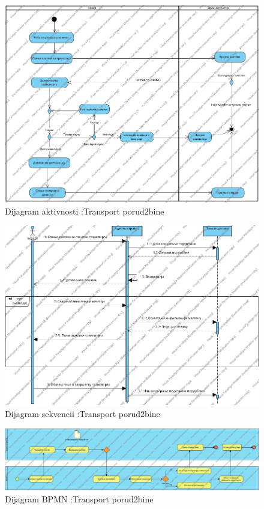 \begin{figure}[h!]
	\includegraphics[scale=0.4]{Slike/SUdostavljanjePorudzbineActivity}
	\centering
	\caption{Dijagram aktivnosti :Transport porud2bine}
	\label{ucDostavljanjeAktivnost}
\end{figure}
\begin{figure}[h!]
	\includegraphics[scale=0.4]{Slike/SUdostavljanjePorudzbineDijagram Sekvenci}
	\centering
	\caption{Dijagram sekvencii :Transport porud2bine}
	\label{ucDostavljanjeSekvence}
\end{figure}
\begin{figure}[h!]
	\includegraphics[scale=0.28]{Slike/SUdostavljanjePorudzbineBPMN}
	\centering
	\caption{Dijagram BPMN :Transport porud2bine}
	\label{ucDostavljanjeBPMN}
\end{figure}








